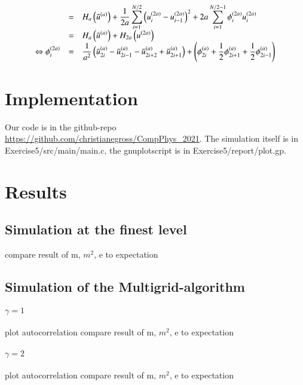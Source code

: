 \documentclass{scrartcl}
\begin{document}
\[\begin{array}{>{\displaystyle}r>{\displaystyle}c>{\displaystyle}l}
&&\\



&=&H_a\left(  \tilde{u}^{(a)}\right) + \frac{1}{2a}\sum_{i=1}^{N/2} \left( u_i^{(2a)}-u_{i-1}^{(2a)}\right)^2 +2a\sum_{i=1}^{N/2-1}\phi_i^{(2a)}u_i^{(2a)}\\

&=&H_a\left( \tilde{u}^{(a)}\right) +H_{2a}\left( u^{(2a)}\right) \\

\Leftrightarrow \phi_i^{(2a)}&=&\frac{1}{a^2}\left(\tilde{u}_{2i}^{(a)}-\tilde{u}_{2i-1}^{(a)}-\tilde{u}_{2i+2}^{(a)}+\tilde{u}_{2i+1}^{(a)}  \right)+\left( \phi_{2i}^{(a)}+\frac{1}{2}\phi_{2i+1}^{(a)}+\frac{1}{2}\phi_{2i-1}^{(a)}\right)\\
\end{array}\]

\section{Implementation}

Our code is in the github-repo \url{https://github.com/christianegross/CompPhys\_2021}. The simulation itself is in Exercise5/src/main/main.c, the gnuplotscript is in Exercise5/report/plot.gp. 

\section{Results}
\subsection{Simulation at the finest level}
compare result of m, $m^2$, e to expectation

\subsection{Simulation of the Multigrid-algorithm}
\paragraph{$\gamma=1$}
plot autocorrelation
compare result of m, $m^2$, e to expectation
\paragraph{$\gamma=2$}
plot autocorrelation
compare result of m, $m^2$, e to expectation

\newpage	
\listoffigures
\printbibliography
\end{document}
